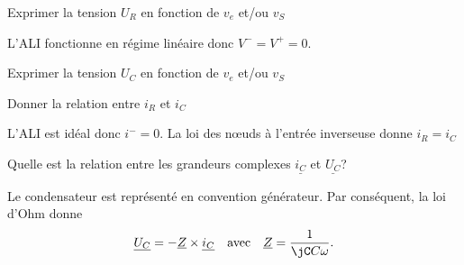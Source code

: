 
\begin{enonce}
  Exprimer la tension \(U_{R}\) en fonction de \(v_{e}\) et/ou \(v_{S}\)
\end{enonce}


\begin{corrige}
  L’ALI fonctionne en régime linéaire donc \(V^{-} = V^{+} = 0\).
\end{corrige}




\begin{enonce}
  Exprimer la tension \(U_{C}\) en fonction de \(v_{e}\) et/ou \(v_{S}\)
\end{enonce}





\begin{enonce}
  Donner la relation entre \(i_{R}\) et \(i_{C}\)
\end{enonce}


\begin{corrige}
  L’ALI est idéal donc \(i^{-} = 0\). La loi des nœuds à l’entrée inverseuse donne \(i_{R} = i_{C}\)
\end{corrige}




\begin{enonce}
  Quelle est la relation entre les grandeurs complexes \(\underline{i_{C}}\) et \(\underline{U_{C}}\)?
\end{enonce}


\begin{corrige}
  Le condensateur est représenté en convention générateur. Par conséquent, la loi d’Ohm donne 
  \[
  \underline{U_{C}} = -\underline{Z}\times \underline{i_{C}} \quad\text{avec}\quad \underline{Z} = \frac{1}{\jC C\omega}.
  \] 
\end{corrige}


